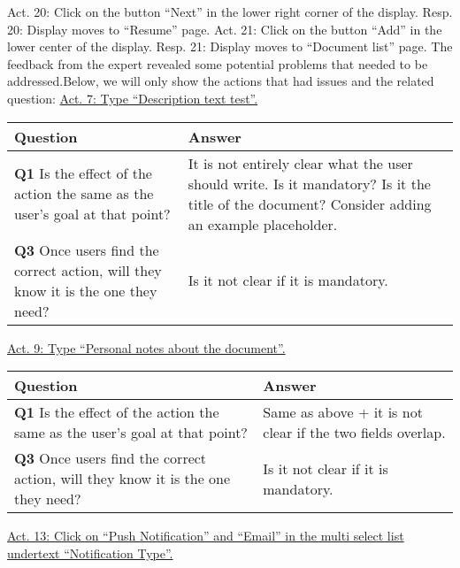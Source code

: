 Act. 20: Click on the button “Next” in the lower right corner of the display.\newline
Resp. 20: Display moves to “Resume” page.\newline\newline
Act. 21: Click on the button “Add” in the lower center of the display.\newline
Resp. 21: Display moves to “Document list” page.\newline\newline
The feedback from the expert revealed some potential problems that needed to be addressed.\newline Below, we will only show the actions that had issues and the related question:\newline\newline
\underline{Act. 7: Type “Description text test”.}
\begin{table}[H]
	\begin{tabularx}{\textwidth}{|X|X|}
		\hline
		\textbf{Question} & \textbf{Answer} \\
		\hline
		\textbf{Q1} Is the effect of the action the same as the user’s goal at that point? & It is not entirely clear what the user should write. Is it mandatory? Is it the title of the document? Consider adding an example placeholder. \\
		\hline
		\textbf{Q3} Once users find the correct action, will they know it is the one they need? & Is it not clear if it is mandatory. \\
		\hline
	\end{tabularx}
\end{table}
\noindent
\underline{Act. 9: Type “Personal notes about the document”.}
\begin{table}[H]
	\begin{tabularx}{\textwidth}{|X|X|}
		\hline
		\textbf{Question} & \textbf{Answer} \\
		\hline
		\textbf{Q1} Is the effect of the action the same as the user’s goal at that point? & Same as above + it is not clear if the two fields overlap. \\
		\hline
		\textbf{Q3} Once users find the correct action, will they know it is the one they need? & Is it not clear if it is mandatory. \\
		\hline
	\end{tabularx}
\end{table}
\clearpage
\noindent
\underline{Act. 13: Click on “Push Notification” and “Email” in the multi select list under}\newline \underline{text “Notification Type”.}
